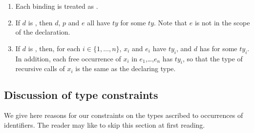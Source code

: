 \documentclass[11pt]{article}
\begin{document}
\begin{description}
        \begin{enumerate}\vspace*{-2mm}

          \item Each binding  is
              treated as .



          \item If $d$ is , then $d$, $p$ and $e$ all have $ty$
		for some $ty$.%
                Note that $e$ is not in the scope of the declaration.


          \item If $d$ is ,
		 then, for each $i\in\{1,\dots,n\}$, $x_i$ and $e_i$
                 have $ty_i$, and $d$ has
		  for some $ty_i$.  In addition,
		 each free occurrence of $x_i$ in $e_1$,\ldots,$e_n$ has $ty_i$,
		 so that the type of recursive calls of $x_i$ is the same as the
		 declaring type.
        \end{enumerate}

\end{description}


\subsection {Discussion of type constraints}
\label{sec:ML-ty-con-discuss}

We give here reasons for our constraints on the types ascribed to occurrences
of identifiers.  The reader may like to skip this section at first reading.
\end{document}
